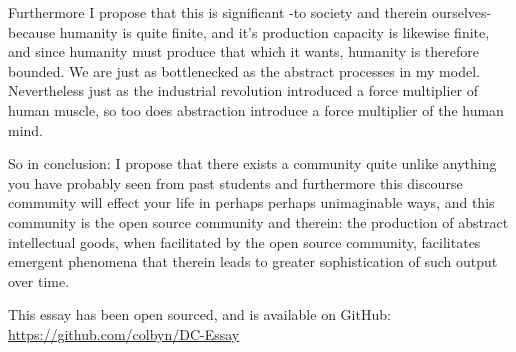 Furthermore I propose that this is significant -to society and therein ourselves- because humanity is quite finite, and it’s production capacity is likewise finite, and since humanity must produce that which it wants, humanity is therefore bounded. We are just as bottlenecked as the abstract processes in my model. Nevertheless just as the industrial revolution introduced a force multiplier of human muscle, so too does abstraction introduce a force multiplier of the human mind.

So in conclusion: I propose that there exists a community quite unlike anything you have probably seen from past students and furthermore this discourse community will effect your life in perhaps perhaps unimaginable ways, and this community is the open source community and therein: the production of abstract intellectual goods, when facilitated by the open source community, facilitates emergent phenomena that therein leads to greater sophistication of such output over time. 

\begin{center}
This essay has been open sourced, and is available on GitHub:
\url{https://github.com/colbyn/DC-Essay}
\end{center}






